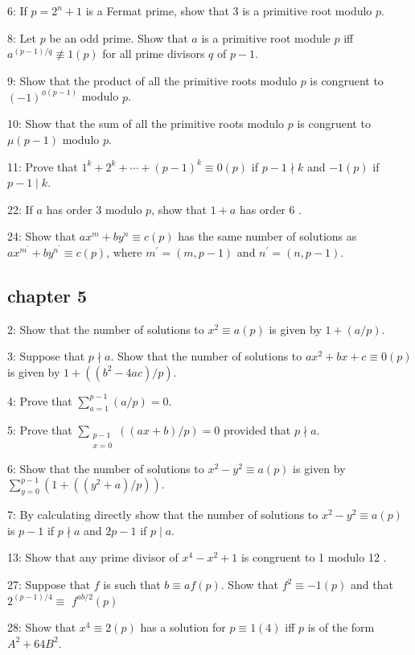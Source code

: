 \documentclass{article}
\begin{document}
6: If $p=2^{n}+1$ is a Fermat prime, show that 3 is a primitive root modulo $p$.

8: Let $p$ be an odd prime. Show that $a$ is a primitive root module $p$ iff $a^{(p-1) / q} \not \equiv 1(p)$ for all prime divisors $q$ of $p-1$.

9: Show that the product of all the primitive roots modulo $p$ is congruent to $(-1)^{\phi(p-1)}$ modulo $p$.

10: Show that the sum of all the primitive roots modulo $p$ is congruent to $\mu(p-1)$ modulo $p$.

11: Prove that $1^{k}+2^{k}+\cdots+(p-1)^{k} \equiv 0(p)$ if $p-1 \nmid k$ and $-1(p)$ if $p-1 \mid k$.

22: If $a$ has order 3 modulo $p$, show that $1+a$ has order 6 .

24: Show that $a x^{m}+b y^{n} \equiv c(p)$ has the same number of solutions as $a x^{m^{\prime}}+b y^{n^{\prime}} \equiv c(p)$, where $m^{\prime}=(m, p-1)$ and $n^{\prime}=(n, p-1)$.

\subsection*{chapter 5}
2: Show that the number of solutions to $x^{2} \equiv a(p)$ is given by $1+(a / p)$.

3: Suppose that $p \nmid a$. Show that the number of solutions to $a x^{2}+b x+c \equiv 0(p)$ is given by $1+\left(\left(b^{2}-4 a c\right) / p\right)$.

4: Prove that $\sum_{a=1}^{p-1}(a / p)=0$.

5: Prove that $\sum_{\substack{p-1 \\ x=0}}((a x+b) / p)=0$ provided that $p \nmid a .$

6: Show that the number of solutions to $x^{2}-y^{2} \equiv a(p)$ is given by $\sum_{y=0}^{p-1}\left(1+\left(\left(y^{2}+a\right) / p\right)\right) .$

7: By calculating directly show that the number of solutions to $x^{2}-y^{2} \equiv a(p)$ is $p-1$ if $p \nmid a$ and $2 p-1$ if $p \mid a$. 

13: Show that any prime divisor of $x^{4}-x^{2}+1$ is congruent to 1 modulo 12 .

27: Suppose that $f$ is such that $b \equiv a f(p)$. Show that $f^{2} \equiv-1(p)$ and that $2^{(p-1) / 4} \equiv$ $f^{a b / 2}(p)$

28: Show that $x^{4} \equiv 2(p)$ has a solution for $p \equiv 1(4)$ iff $p$ is of the form $A^{2}+64 B^{2}$.
\end{document}
